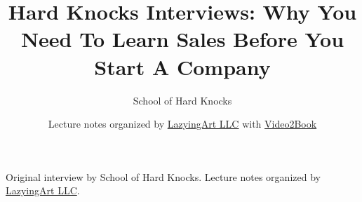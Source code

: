 \documentclass[11pt,oneside]{book}
\begin{document}
\frontmatter
\title{Hard Knocks Interviews: Why You Need To Learn Sales Before You Start A Company}
\author{School of Hard Knocks}
\date{Lecture notes organized by \href{https://lazying.art}{LazyingArt LLC} with \href{https://github.com/lachlanchen/Video2Book}{Video2Book}}
\maketitle
\begin{center}
\small Original interview by School of Hard Knocks. Lecture notes organized by \href{https://lazying.art}{LazyingArt LLC}.
\end{center}
\clearpage
\mainmatter

\end{document}
